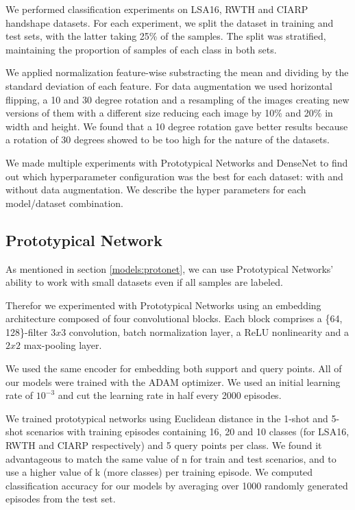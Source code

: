 We performed classification experiments on LSA16, RWTH and CIARP  handshape datasets. For each experiment, we split the dataset in training and test sets, with the latter taking 25\% of the samples.  The split was stratified,  maintaining the proportion of samples of each class in both sets.

We applied normalization feature-wise substracting the mean and dividing by the standard deviation of each feature. For data augmentation we used horizontal flipping, a 10 and 30 degree rotation and a resampling of the images creating new versions of them with a different size reducing each image by 10\% and 20\% in width and height. We found that a 10 degree rotation gave better results because a rotation of 30 degrees showed to be too high for the nature of the datasets.

We made multiple experiments with Prototypical Networks and DenseNet to find out which hyperparameter configuration was the best for each dataset: with and without data augmentation. We describe the hyper parameters for each model/dataset combination.

\subsection{Prototypical Network}

As mentioned in section \ref{models:protonet}, we can use Prototypical Networks' ability to work with small datasets even if all samples are labeled.

Therefor we experimented with Prototypical Networks using an embedding architecture composed of four convolutional blocks. Each block comprises a \{64, 128\}-filter $3 x 3$ convolution, batch normalization layer, a ReLU nonlinearity and a $2 x 2$ max-pooling layer.

We used the same encoder for embedding both support and query points. All of our models were trained  with the ADAM\cite{Adam} optimizer. We used an initial learning rate of $10^{-3}$ and cut the learning rate in half every 2000 episodes.

We trained prototypical networks using Euclidean distance in the 1-shot and 5-shot scenarios with training episodes containing 16, 20 and 10 classes (for LSA16, RWTH and CIARP respectively) and 5 query points per class. We found it advantageous to match the same value of n for train and test scenarios, and to use a higher value of k (more classes) per training episode. We computed classification accuracy for our models by averaging over 1000 randomly generated episodes from the test set.

